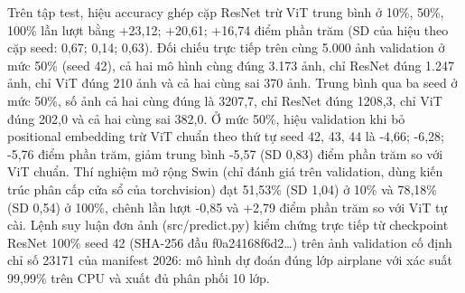 Trên tập test, hiệu accuracy ghép cặp ResNet trừ ViT trung bình ở 10\%, 50\%, 100\% lần lượt bằng +23,12; +20,61; +16,74 điểm phần trăm (SD của hiệu theo cặp seed: 0,67; 0,14; 0,63). Đối chiếu trực tiếp trên cùng 5.000 ảnh validation ở mức 50\% (seed 42), cả hai mô hình cùng đúng 3.173 ảnh, chỉ ResNet đúng 1.247 ảnh, chỉ ViT đúng 210 ảnh và cả hai cùng sai 370 ảnh. Trung bình qua ba seed ở mức 50\%, số ảnh cả hai cùng đúng là 3207,7, chỉ ResNet đúng 1208,3, chỉ ViT đúng 202,0 và cả hai cùng sai 382,0. Ở mức 50\%, hiệu validation khi bỏ positional embedding trừ ViT chuẩn theo thứ tự seed 42, 43, 44 là -4,66; -6,28; -5,76 điểm phần trăm, giảm trung bình -5,57 (SD 0,83) điểm phần trăm so với ViT chuẩn. Thí nghiệm mở rộng Swin (chỉ đánh giá trên validation, dùng kiến trúc phân cấp cửa sổ của torchvision) đạt 51,53\% (SD 1,04) ở 10\% và 78,18\% (SD 0,54) ở 100\%, chênh lần lượt -0,85 và +2,79 điểm phần trăm so với ViT tự cài. Lệnh suy luận đơn ảnh (src/predict.py) kiểm chứng trực tiếp từ checkpoint ResNet 100\% seed 42 (SHA-256 đầu f0a24168f6d2\ldots) trên ảnh validation cố định chỉ số 23171 của manifest 2026: mô hình dự đoán đúng lớp airplane với xác suất 99,99\% trên CPU và xuất đủ phân phối 10 lớp.
